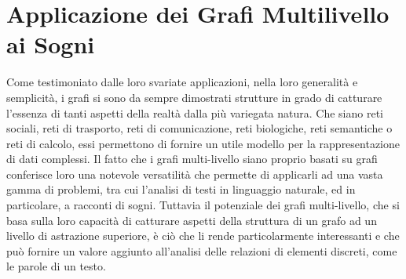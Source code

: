 \chapter{Applicazione dei Grafi Multilivello ai Sogni} \label{cap:applicazione-dei-grafi-multilivello-ai-sogni}

Come testimoniato dalle loro svariate applicazioni, nella loro generalità e semplicità, i grafi si sono da sempre
dimostrati strutture in grado di catturare l'essenza di tanti aspetti della realtà dalla più variegata natura.
Che siano reti sociali, reti di trasporto, reti di comunicazione, reti biologiche, reti semantiche o reti di calcolo,
essi permettono di fornire un utile modello per la rappresentazione di dati complessi.
Il fatto che i grafi multi-livello siano proprio basati su grafi conferisce loro una notevole versatilità che permette
di applicarli ad una vasta gamma di problemi, tra cui l'analisi di testi in linguaggio naturale,
ed in particolare, a racconti di sogni.
Tuttavia il potenziale dei grafi multi-livello, che si basa sulla loro capacità di catturare aspetti della struttura
di un grafo ad un livello di astrazione superiore, è ciò che li rende particolarmente interessanti e che può
fornire un valore aggiunto all'analisi delle relazioni di elementi discreti, come le parole di un testo. \newline

